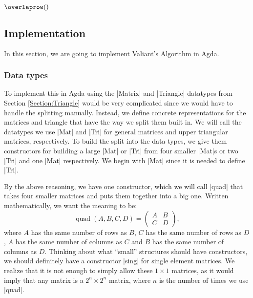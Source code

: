 $\overlaprow()$
\subsection{Implementation}
In this section, we are going to implement Valiant's Algorithm in Agda.
\subsubsection{Data types}
To implement this in Agda using the |Matrix| and |Triangle| datatypes from Section \ref{Section:Triangle} would be very complicated since we would have to handle the splitting manually. Instead, we define concrete representations for the matrices and triangle that have the way we split them built in.
We will call the datatypes we use |Mat| and |Tri| for general matrices and upper triangular matrices, respectively.
To build the split into the data types, we give them constructors for building a large |Mat| or |Tri| from four smaller |Mat|s or two |Tri| and one |Mat| respectively. We begin with |Mat| since it is needed to define |Tri|. 

By the above reasoning, we have one constructor, which we will call |quad| that takes four smaller matrices and puts them together into a big one. Written mathematically, we want the meaning to be:
\begin{equation*}
\operatorname{quad}(A,B,C,D) = 
\begin{pmatrix} 
  A & B \\
  C & D
\end{pmatrix},
\end{equation*}
where $A$ has the same number of rows as $B$, $C$ has the same number of rows as $D$, $A$ has the same number of columns as $C$ and $B$ has the same number of columns as $D$.
Thinking about what ``small'' structures should have constructors, we should definitely have a constructor |sing| for single element matrices. We realize that it is not enough to simply allow these $1 \times 1$ matrices, as it would imply that any matrix is a $2^n \times 2^n$ matrix, where $n$ is the number of times we use |quad|. 

